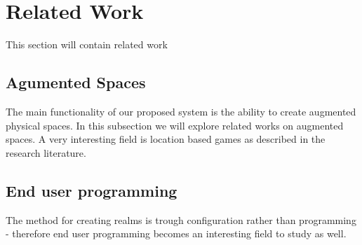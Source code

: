 \section{Related Work} %
\label{sec:related_work}
This section will contain related work

\subsection{Agumented Spaces} %
\label{sub:agumented_spaces}
The main functionality of our proposed system is the ability to create augmented physical spaces. In this subsection we will explore related works on augmented spaces. A very interesting field is location based games as described in the research literature.

\subsection{End user programming} %
\label{sub:end_user_programming}
The method for creating realms is trough configuration rather than programming - therefore end user programming becomes an interesting field to study as well.
